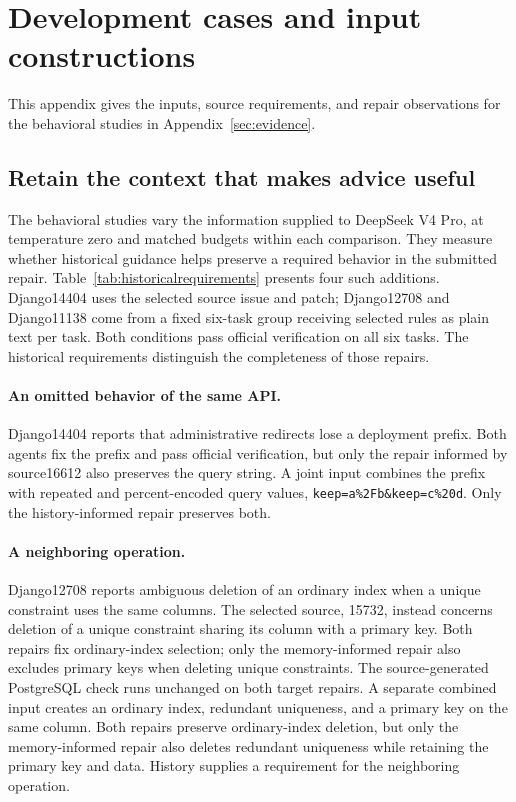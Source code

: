 \section{Development cases and input constructions}
\label{sec:development-details}
This appendix gives the inputs, source requirements, and repair observations
for the behavioral studies in Appendix~\ref{sec:evidence}.
\subsection{Retain the context that makes advice useful}
\label{sec:details-evidence}
\label{sec:details-content}
The behavioral studies vary the information supplied to DeepSeek V4 Pro, at
temperature zero and matched budgets within each comparison.
They measure whether historical guidance helps preserve a required
behavior in the submitted repair.
Table~\ref{tab:historicalrequirements} presents four such additions.
Django14404 uses the selected source issue and patch; Django12708 and
Django11138 come from a fixed six-task group receiving selected rules
as plain text per task. Both conditions pass official verification on all six tasks.
The historical requirements distinguish the completeness of those repairs.

\paragraph{An omitted behavior of the same API.}
Django14404 reports that administrative redirects lose a deployment prefix.
Both agents fix the prefix and pass official verification, but only the repair informed by source16612 also preserves the query string.
A joint input combines the prefix with repeated and percent-encoded query values, \texttt{keep=a\%2Fb}\allowbreak\texttt{\&keep=c\%20d}.
Only the history-informed repair preserves both.

\paragraph{A neighboring operation.}
Django12708 reports ambiguous deletion of an ordinary index when a unique constraint uses the same columns.
The selected source, 15732, instead concerns deletion of a unique constraint sharing its column with a primary key.
Both repairs fix ordinary-index selection; only the memory-informed repair also excludes primary keys when deleting unique constraints.
The source-generated PostgreSQL check runs unchanged on both target repairs.
A separate combined input creates an ordinary index, redundant uniqueness, and a primary key on the same column.
Both repairs preserve ordinary-index deletion, but only the memory-informed repair also deletes redundant uniqueness while retaining the primary key and data.
History supplies a requirement for the neighboring operation.

